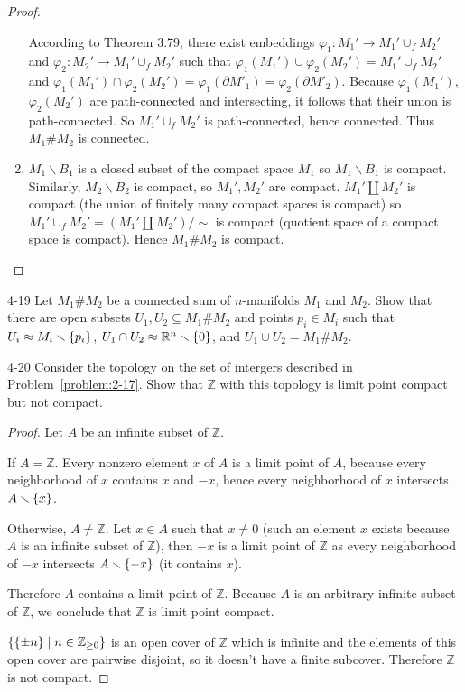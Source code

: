 \begin{proof}
\begin{enumerate}[label={(\alph*)}]
		      According to Theorem 3.79, there exist embeddings $\varphi_{1}: M_{1}' \to M_{1}' \cup_{f} M_{2}'$ and $\varphi_{2}: M_{2}' \to M_{1}' \cup_{f} M_{2}'$ such that $\varphi_{1}(M_{1}') \cup \varphi_{2}(M_{2}') = M_{1}' \cup_{f} M_{2}'$ and $\varphi_{1}(M_{1}') \cap \varphi_{2}(M_{2}') = \varphi_{1}(\partial M'_{1}) = \varphi_{2}(\partial M'_{2})$. Because $\varphi_{1}(M_{1}')$, $\varphi_{2}(M_{2}')$ are path-connected and intersecting, it follows that their union is path-connected. So $M_{1}' \cup_{f} M_{2}'$ is path-connected, hence connected. Thus $M_{1} \# M_{2}$ is connected.
		\item $M_{1}\smallsetminus B_{1}$ is a closed subset of the compact space $M_{1}$ so $M_{1}\smallsetminus B_{1}$ is compact. Similarly, $M_{2}\smallsetminus B_{2}$ is compact, so $M_{1}', M_{2}'$ are compact. $M_{1}' \amalg M_{2}'$ is compact (the union of finitely many compact spaces is compact) so $M_{1}' \cup_{f} M_{2}' = (M_{1}' \amalg M_{2}')/\sim$ is compact (quotient space of a compact space is compact). Hence $M_{1}\# M_{2}$ is compact.
	\end{enumerate}
\end{proof}

\begin{problem}{4-19}
Let $M_{1} \# M_{2}$ be a connected sum of $n$-manifolds $M_{1}$ and $M_{2}$. Show that there are open subsets $U_{1}, U_{2} \subseteq M_{1} \# M_{2}$ and points $p_{i} \in M_{i}$ such that $U_{i} \approx M_{i}\smallsetminus \left\{{p_{i}}\right\}$, $U_{1} \cap U_{2} \approx \mathbb{R}^{n}\smallsetminus \left\{{0}\right\}$, and $U_{1} \cup U_{2} = M_{1} \# M_{2}$.
\end{problem}

\begin{problem}{4-20}
Consider the topology on the set of intergers described in Problem~\ref{problem:2-17}. Show that $\mathbb{Z}$ with this topology is limit point compact but not compact.
\end{problem}

\begin{proof}
	Let $A$ be an infinite subset of $\mathbb{Z}$.

	If $A = \mathbb{Z}$. Every nonzero element $x$ of $A$ is a limit point of $A$, because every neighborhood of $x$ contains $x$ and $-x$, hence every neighborhood of $x$ intersects $A\smallsetminus\left\{{x}\right\}$.

	Otherwise, $A \ne \mathbb{Z}$. Let $x\in A$ such that $x\ne 0$ (such an element $x$ exists because $A$ is an infinite subset of $\mathbb{Z}$), then $-x$ is a limit point of $\mathbb{Z}$ as every neighborhood of $-x$ intersects $A\smallsetminus\left\{{-x}\right\}$ (it contains $x$).

	Therefore $A$ contains a limit point of $\mathbb{Z}$. Because $A$ is an arbitrary infinite subset of $\mathbb{Z}$, we conclude that $\mathbb{Z}$ is limit point compact.

	$\left\{{ \left\{{\pm n}\right\} \mid n\in\mathbb{Z}_{\geq 0} }\right\}$ is an open cover of $\mathbb{Z}$ which is infinite and the elements of this open cover are pairwise disjoint, so it doesn't have a finite subcover. Therefore $\mathbb{Z}$ is not compact.
\end{proof}

